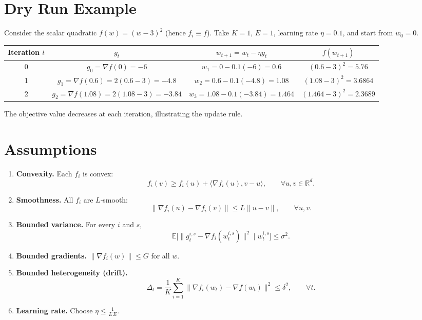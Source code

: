\documentclass{article}
\begin{document}
\section*{Dry Run Example}
Consider the scalar quadratic $f(w)=(w-3)^2$ (hence $f_i\equiv f$).  
Take $K=1$, $E=1$, learning rate $\eta=0.1$, and start from $w_0=0$.

\begin{center}
\begin{tabular}{c|c|c|c}
Iteration $t$ & $g_t$ & $w_{t+1}=w_t-\eta g_t$ & $f(w_{t+1})$\\ \hline
0 & $g_0=\nabla f(0)= -6$ & $w_1=0-0.1(-6)=0.6$ & $(0.6-3)^2=5.76$\\
1 & $g_1=\nabla f(0.6)=2(0.6-3)=-4.8$ & $w_2=0.6-0.1(-4.8)=1.08$ & $(1.08-3)^2=3.6864$\\
2 & $g_2=\nabla f(1.08)=2(1.08-3)=-3.84$ & $w_3=1.08-0.1(-3.84)=1.464$ & $(1.464-3)^2=2.3689$\\
\end{tabular}
\end{center}
The objective value decreases at each iteration, illustrating the update rule.

\newpage
\section*{Assumptions}
\begin{enumerate}
\item \textbf{Convexity.} Each $f_i$ is convex:
\[
f_i(v)\ge f_i(u)+\langle\nabla f_i(u),v-u\rangle,\qquad\forall u,v\in\mathbb{R}^d .
\]
\item \textbf{Smoothness.} All $f_i$ are $L$‑smooth:
\[
\|\nabla f_i(u)-\nabla f_i(v)\|\le L\|u-v\|,\qquad\forall u,v .
\]
\item \textbf{Bounded variance.} For every $i$ and $s$,
\[
\mathbb{E}\!\bigl[\|g_{t}^{i,s}-\nabla f_i(w_{t}^{i,s})\|^2\mid w_{t}^{i,s}\bigr]\le\sigma^2 .
\]
\item \textbf{Bounded gradients.} $\|\nabla f_i(w)\|\le G$ for all $w$.
\item \textbf{Bounded heterogeneity (drift).}
\[
\Delta_t=\frac1K\sum_{i=1}^K\|\nabla f_i(w_t)-\nabla f(w_t)\|^2\le\delta^2,\qquad\forall t .
\]
\item \textbf{Learning rate.} Choose $\eta\le \frac{1}{L\,E}$.
\end{enumerate}
\end{document}
